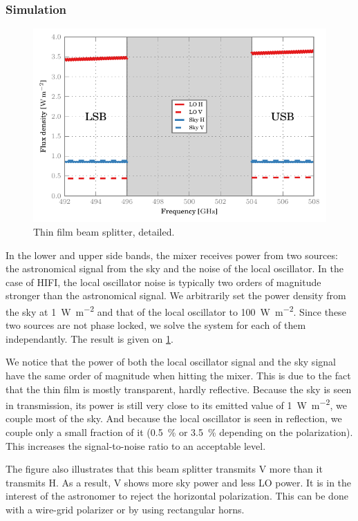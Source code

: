 \subsubsection{Simulation}
\begin{figure}[hbtp]
    \centering
    \includegraphics{thin_film_beam_splitter_detailed}
    \caption{Thin film beam splitter, detailed.}
    \label{fig:thin_film_beam_splitter_detailed}
\end{figure}
In the lower and upper side bands, the mixer receives power from two sources: the astronomical signal from the sky and the noise of the local oscillator.
In the case of HIFI, the local oscillator noise is typically two orders of magnitude stronger than the astronomical signal.
We arbitrarily set the power density from the sky at \SI{1}{\watt\per\meter\squared} and that of the local oscillator to \SI{100}{\watt\per\meter\squared}.
Since these two sources are not phase locked, we solve the system for each of them independantly.
The result is given on \cref{fig:thin_film_beam_splitter_detailed}.

We notice that the power of both the local oscillator signal and the sky signal have the same order of magnitude when hitting the mixer.
This is due to the fact that the thin film is mostly transparent, hardly reflective.
Because the sky is seen in transmission, its power is still very close to its emitted value of \SI{1}{\watt\per\meter\squared}, we couple most of the sky.
And because the local oscillator is seen in reflection, we couple only a small fraction of it (\SI{0.5}{\percent} or \SI{3.5}{\percent} depending on the polarization).
This increases the signal-to-noise ratio to an acceptable level.

The figure also illustrates that this beam splitter transmits V more than it transmits H.
As a result, V shows more sky power and less LO power.
It is in the interest of the astronomer to reject the horizontal polarization.
This can be done with a wire-grid polarizer or by using rectangular horns.

